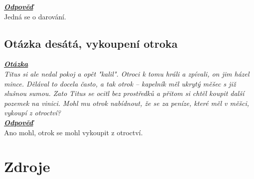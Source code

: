 \documentclass{article}
\begin{document}
\noindent\noindent\textbf{\textit{\underline{Odpověď}}}\\

Jedná se o darování.

\subsection{Otázka desátá, vykoupení otroka}
\textbf{\textit{\underline{Otázka}}}\\
\textit{Titus si ale nedal pokoj a opět "kalil". Otroci k tomu hráli a zpívali, on jim házel mince. Dělával to docela často, a tak otrok – kapelník měl ukrytý měšec s již slušnou sumou. Zato Titus se ocitl bez prostředků a přitom si chtěl koupit další pozemek na vinici. Mohl mu otrok nabídnout, že se za peníze, které měl v měšci, vykoupí z otroctví?}\\

\noindent\noindent\textbf{\textit{\underline{Odpověď}}}\\

Ano mohl, otrok se mohl vykoupit z otroctví.

\newpage
\thispagestyle{Contents}
\section*{Zdroje}
\setcounter{SecZdroje}{\thesection}
\addtocounter{SecZdroje}{1}
\printbibliography[type=misc,heading=subbibliography,title={Online zdroje}]
\printbibliography[type=book,heading=subbibliography,title={Knižní zdroje}]
\printbibliography[type=article,heading=subbibliography,title={Články}]
\end{document}
